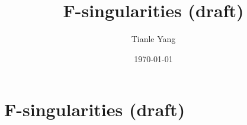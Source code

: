 \documentclass{noteformyself}
\title{F-singularities (draft)}
\author{Tianle Yang}
\date{\today}
\begin{document}
    \maketitle

    \section{F-singularities (draft)}


\end{document}
